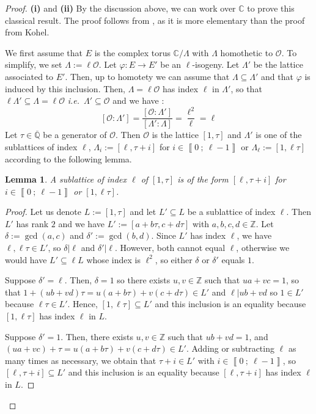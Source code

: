 \documentclass[a4paper,10pt]{report}
\theoremstyle{definition}
\theoremstyle{plain}
\newtheorem{lemma}[definition]{Lemma}
\theoremstyle{definition}
\newcommand{\ie}{\emph{i.e.}\ }
\newcommand{\Z}{\mathbb{Z}}
\newcommand{\Q}{\mathbb{Q}}
\newcommand{\C}{\mathbb{C}}
\newcommand{\mO}{\mathcal{O}}
\renewcommand{\i}[2]{\left\llbracket #1~;~#2\right\rrbracket}
\renewcommand{\(}{\left(}
\renewcommand{\)}{\right)}
\begin{document}
\begin{proof}
\textbf{(i)} and \textbf{(ii)} By the discussion above, we can work over $\C$ to prove this classical result. The proof follows from \cite[theorem 23.5]{MIT}, as it is more elementary than the proof from Kohel. 

We first assume that $E$ is the complex torus $\C/\Lambda$ with $\Lambda$ homothetic to $\mO$. To simplify, we set $\Lambda:=\ell\mO$. Let $\varphi: E\longrightarrow E'$ be an $\ell$-isogeny.  Let $\Lambda'$ be the lattice associated to $E'$. Then, up to homotety we can assume that $\Lambda\subseteq \Lambda'$ and that $\varphi$ is induced by this inclusion. Then, $\Lambda=\ell\mO$ has index $\ell$ in $\Lambda'$, so that $\ell\Lambda'\subseteq\Lambda=\ell\mO$ \ie $\Lambda'\subseteq\mO$ and we have : 
\[[\mO:\Lambda']=\frac{[\mO:\Lambda']}{[\Lambda':\Lambda]}=\frac{\ell^2}{\ell}=\ell\]
Let $\tau\in\overline{\Q}$ be a generator of $\mO$. Then $\mO$ is the lattice $[1,\tau]$ and $\Lambda'$ is one of the sublattices of index $\ell$, $\Lambda_i:=[\ell,\tau+i]$ for $i\in\i{0}{\ell-1}$ or $\Lambda_\ell:=[1,\ell\tau]$ according to the following lemma.

\begin{lemma}
A sublattice of index $\ell$ of $[1,\tau]$ is of the form $[\ell,\tau+i]$ for $i\in\i{0}{\ell-1}$ or $[1,\ell\tau]$.
\end{lemma}

\begin{proof}
Let us denote $L:=[1,\tau]$ and let $L'\subseteq L$ be a sublattice of index $\ell$. Then $L'$ has rank $2$ and we have $L':=[a+b\tau,c+d\tau]$ with $a,b,c,d\in\Z$.  Let $\delta:=\gcd(a,c)$ and $\delta':=\gcd(b,d)$. Since $L'$ has index $\ell$, we have $\ell,\ell\tau\in L'$, so $\delta|\ell$ and $\delta'|\ell$. However, both cannot equal $\ell$, otherwise we would have $L'\subseteq\ell L$ whose index is $\ell^2$, so either $\delta$ or $\delta'$ equals $1$.  

Suppose $\delta'=\ell$.  Then, $\delta=1$ so there exists $u, v\in\Z$ such that $ua+vc=1$, so that $1+(ub+vd)\tau=u(a+b\tau)+v(c+d\tau)\in L'$ and $\ell|ub+vd$ so $1\in L'$ because $\ell\tau\in L'$. Hence, $[1,\ell\tau]\subseteq L'$ and this inclusion is an equality because $[1,\ell\tau]$ has index $\ell$ in $L$. 

Suppose $\delta'=1$.  Then, there exists $u, v\in\Z$ such that $ub+vd=1$, and $(ua+vc)+\tau=u(a+b\tau)+v(c+d\tau)\in L'$. Adding or subtracting $\ell$ as many times as necessary, we obtain that $\tau+i\in L'$ with $i\in\i{0}{\ell-1}$, so $[\ell,\tau+i]\subseteq L'$ and this inclusion is an equality because $[\ell,\tau+i]$ has index $\ell$ in $L$. 
\end{proof}


\end{proof}
\end{document}

